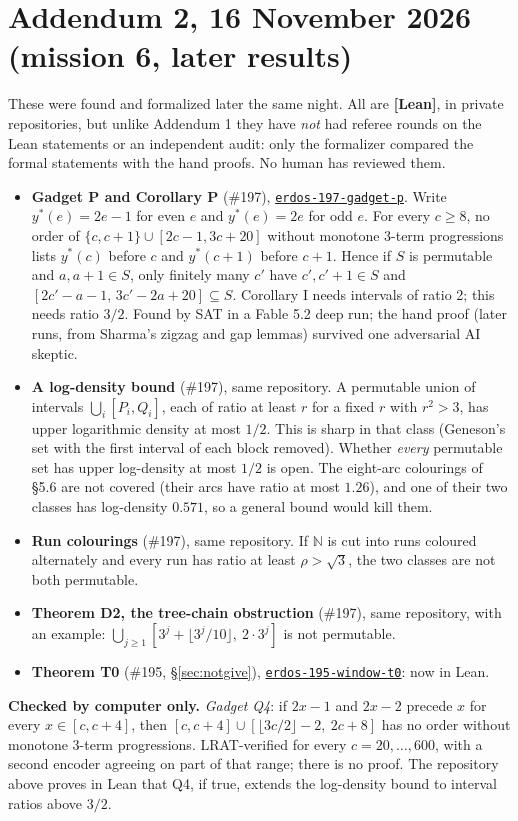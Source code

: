\documentclass[11pt,letterpaper]{article}
\newcommand{\N}{\mathbb{N}}
\newcommand{\repo}[1]{\href{https://github.com/Alex-lop/#1}{\nolinkurl{#1}}}
\begin{document}
\section{Addendum 2, 16 November 2026 (mission 6, later results)}
These were found and formalized later the same night. All are \textbf{[Lean]}, in private repositories, but unlike
Addendum 1 they have \emph{not} had referee rounds on the Lean statements or an independent audit: only the formalizer
compared the formal statements with the hand proofs. No human has reviewed them.
\begin{itemize}
\item \textbf{Gadget P and Corollary P} (\#197), \repo{erdos-197-gadget-p}. Write $y^*(e)=2e-1$ for even $e$ and
$y^*(e)=2e$ for odd $e$. For every $c\ge 8$, no order of $\{c,c+1\}\cup[2c-1,3c+20]$ without monotone 3-term
progressions lists $y^*(c)$ before $c$ and $y^*(c+1)$ before $c+1$. Hence if $S$ is permutable and $a,a+1\in S$, only
finitely many $c'$ have $c',c'+1\in S$ and $[2c'-a-1,\,3c'-2a+20]\subseteq S$. Corollary I needs intervals of ratio 2;
this needs ratio $3/2$. Found by SAT in a Fable 5.2 deep run; the hand proof (later runs, from Sharma's zigzag and gap
lemmas) survived one adversarial AI skeptic.
\item \textbf{A log-density bound} (\#197), same repository. A permutable union of intervals $\bigcup_i[P_i,Q_i]$, each of
ratio at least $r$ for a fixed $r$ with $r^2>3$, has upper logarithmic density at most $1/2$. This is sharp in that
class (Geneson's set with the first interval of each block removed). Whether \emph{every} permutable set has upper
log-density at most $1/2$ is open. The eight-arc colourings of \S5.6 are not covered (their
arcs have ratio at most $1.26$), and one of their two classes has log-density $0.571$, so a general bound would kill them.
\item \textbf{Run colourings} (\#197), same repository. If $\N$ is cut into runs coloured alternately and every run has
ratio at least $\rho>\sqrt3$, the two classes are not both permutable.
\item \textbf{Theorem D2, the tree-chain obstruction} (\#197), same repository, with an example:
$\bigcup_{j\ge1}[3^j+\lfloor 3^j/10\rfloor,\ 2\cdot 3^j]$ is not permutable.
\item \textbf{Theorem T0} (\#195, \S\ref{sec:notgive}), \repo{erdos-195-window-t0}: now in Lean.
\end{itemize}
\textbf{Checked by computer only.} \emph{Gadget Q4}: if $2x-1$ and $2x-2$ precede $x$ for every $x\in[c,c+4]$, then
$[c,c+4]\cup[\lfloor 3c/2\rfloor-2,\ 2c+8]$ has no order without monotone 3-term progressions. LRAT-verified for every
$c=20,\dots,600$, with a second encoder agreeing on part of that range; there is no proof. The repository above proves in
Lean that Q4, if true, extends the log-density bound to interval ratios above $3/2$.
\end{document}
